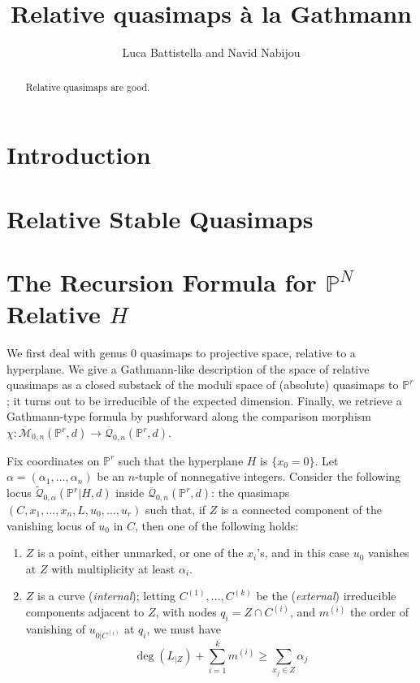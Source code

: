 \documentclass[11pt]{amsart}
\title{Relative quasimaps \`a la Gathmann}
\author{Luca Battistella and Navid Nabijou}
\newcommand{\M}[4]{\overline{\mathcal M}_{#1,#2}(#3,#4)}
\newcommand{\Q}[4]{\overline{\mathcal Q}_{#1,#2}(#3,#4)}
\newcommand{\Qt}[4]{\widetilde{\mathcal Q}_{#1,#2}(#3,#4)}
\newcommand{\PP}{\mathbb P}
\renewcommand{\to}{\rightarrow}
\newcommand{\comp}{\chi}
\theoremstyle{plain}
\theoremstyle{definition}
\begin{document}
\maketitle
\begin{abstract}
Relative quasimaps are good.
\end{abstract}

\tableofcontents

\section{Introduction}

\section{Relative Stable Quasimaps}

\section{The Recursion Formula for $\PP^N$ Relative $H$}

We first deal with genus 0 quasimaps to projective space, relative to a hyperplane. We give a Gathmann-like description of the space of relative quasimaps as a closed substack of the moduli space of (absolute) quasimaps to $\PP^r$; it turns out to be irreducible of the expected dimension. Finally, we retrieve a Gathmann-type formula by pushforward along the comparison morphism $\comp\colon \M{0}{n}{\PP^r}{d}\to\Q{0}{n}{\PP^r}{d}$.

Fix coordinates on $\PP^r$ such that the hyperplane $H$ is $\{x_0=0\}$. Let $\alpha=(\alpha_1,\ldots,\alpha_n)$ be an $n$-tuple of nonnegative integers. Consider the following locus $\Qt{0}{\alpha}{\PP^r|H}{d}$ inside $\Q{0}{n}{\PP^r}{d}$: the quasimaps $(C,x_1,\ldots,x_n,L,u_0,\ldots,u_r)$ such that, if $Z$ is a connected component of the vanishing locus of $u_0$ in $C$, then one of the following holds:

\begin{enumerate}
\item $Z$ is a point, either unmarked, or one of the $x_i$'s, and in this case $u_0$ vanishes at $Z$ with multiplicity at least $\alpha_i$.
\item $Z$ is a curve (\emph{internal}); letting $C^{(1)},\ldots,C^{(k)}$ be the (\emph{external}) irreducible components adjacent to $Z$, with nodes $q_i=Z\cap C^{(i)}$, and $m^{(i)}$ the order of vanishing of $u_{0|C^{(i)}}$ at $q_i$, we must have
\[
\deg(L_{|Z})+\sum_{i=1}^k m^{(i)}\geq\sum_{x_j\in Z} \alpha_j
\]
\end{enumerate}
\end{document}
